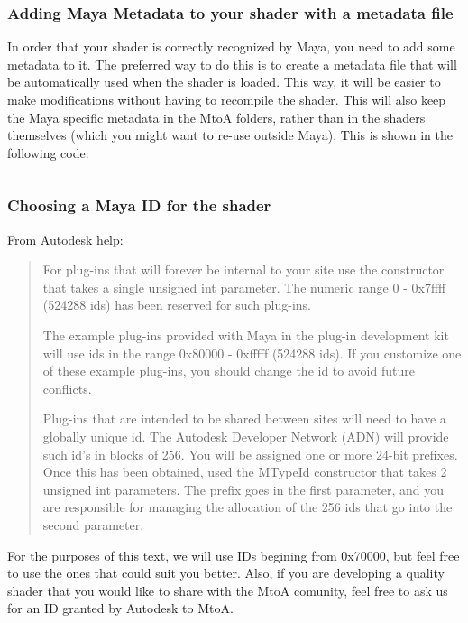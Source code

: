 \subsubsection{Adding Maya Metadata to your shader with a metadata file}
In order that your shader is correctly recognized by Maya, you need to add some metadata to it.
The preferred way to do this is to create a metadata file that will be automatically used when the shader is loaded.
This way, it will be easier to make modifications without having to recompile the shader.
This will also keep the Maya specific metadata in the MtoA folders, rather than in the shaders themselves (which you might want to re-use outside Maya).
This is shown in the following code:

\inputminted[mathescape,
linenos,
numbersep=5pt,
frame=lines,
framesep=2mm,
baselinestretch=1,
fontsize=\footnotesize,
tabsize=3,
label=simpleShader.mtd]
{mtd}{simpleShader.mtd}


\subsubsection{Choosing a Maya ID for the shader}

From Autodesk help:

\begin{quotation}
For plug-ins that will forever be internal to your site use the
constructor that takes a single unsigned int parameter. The numeric
range 0 - 0x7ffff (524288 ids) has been reserved for such plug-ins.

The example plug-ins provided with Maya in the plug-in development kit
will use ids in the range 0x80000 - 0xfffff (524288 ids). If you
customize one of these example plug-ins, you should change the id to
avoid future conflicts.

Plug-ins that are intended to be shared between sites will need to
have a globally unique id. The Autodesk Developer Network (ADN) will
provide such id's in blocks of 256. You will be assigned one or more
24-bit prefixes. Once this has been obtained, used the MTypeId
constructor that takes 2 unsigned int parameters. The prefix goes in
the first parameter, and you are responsible for managing the
allocation of the 256 ids that go into the second parameter.
\end{quotation}

For the purposes of this text, we will use IDs begining from 0x70000, but feel free to use the ones that could suit you better.
Also, if you are developing a quality shader that you would like to share with the MtoA comunity, feel free to ask us for an ID granted by Autodesk to MtoA.

